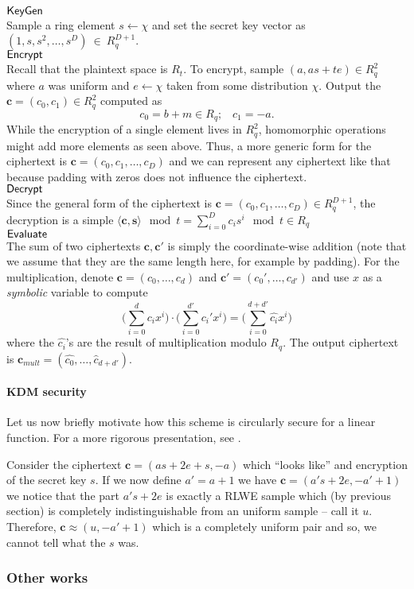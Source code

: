 \begin{mdframed}
	$\textsf{KeyGen}$\\
	Sample a ring element $s \leftarrow \chi$ and set the secret key vector as $(1, s, s^2, \ldots, s^D)~\in~R_q^{D+1}$. \\
	$\textsf{Encrypt}$\\
	Recall that the plaintext space is $R_t$. To encrypt, sample $(a, as +te) \in R_q^2$ where $a$ was uniform and $e \leftarrow \chi$ taken from some distribution $\chi$. Output the $\bm{c} = (c_0, c_1) \in R_q^2$ computed as
	\[c_0 = b +m \in R_q; \; \; \; c_1 = -a.  \]
	While the encryption of a single element lives in $R_q^2$, homomorphic operations might add more elements as seen above. Thus, a more generic form for the ciphertext is $\bm{c} = (c_0, c_1, \ldots, c_D)$ and we can represent any ciphertext like that because padding with zeros does not influence the ciphertext.
	\\
	$\textsf{Decrypt}$\\
	Since the general form of the ciphertext is $\bm{c} = (c_0, c_1, \ldots, c_D) \in R_q^{D+1}$, the decryption is a simple $\langle \bm{c, s} \rangle \mod t = \sum_{i = 0}^D c_i s^i \mod t \in R_q$ \\
	$\textsf{Evaluate}$\\
	The sum of two ciphertexts $\bm{c, c'}$ is simply the coordinate-wise addition (note that we assume that they are the same length here, for example by padding). For the multiplication, denote $\bm{c} = (c_0, \ldots, c_d)$ and $\bm{c'} = (c_0', \ldots, c_{d'})$ and use $x$ as a \textit{symbolic} variable to compute
	\[ \bigg( \sum_{i = 0}^d c_ix^i \bigg) \cdot \bigg(\sum_{i = 0}^{d'} c_i'x^i \bigg) =
	\bigg( \sum_{i = 0}^{d+d'} \hat{c_i}x^i \bigg) \]
	where the $\hat{c_i}$'s are the result of multiplication modulo $R_q$. The output ciphertext is $\bm{c}_{mult} = (\hat{c_0}, \ldots, \hat{c}_{d+d'})$.

\end{mdframed}

\paragraph{KDM security}
Let us now briefly motivate how this scheme is circularly secure for a linear function. For a more rigorous presentation, see \cite{fhe_rlwe}.

Consider the ciphertext $\bm{c}= (as +2e +s, -a)$ which ``looks like'' and encryption of the secret key $s$. If we now define $a' = a +1$ we have $\bm{c} = (a's +2e, -a'+1)$ we notice that the part $a's+2e$ is exactly a RLWE sample which (by previous section) is completely indistinguishable from an uniform sample -- call it $u$. Therefore, $\bm{c} \approx (u, -a'+1)$ which is a completely uniform pair and so, we cannot tell what the $s$ was.

\subsubsection{Other works}

